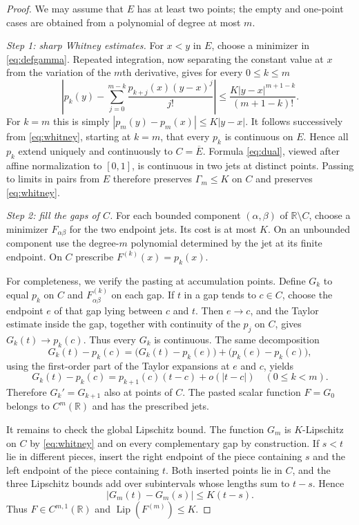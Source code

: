\documentclass[11pt]{article}
\newcommand{\R}{\mathbb R}
\newcommand{\Lip}{\operatorname{Lip}}
\begin{document}
\begin{proof}
We may assume that $E$ has at least two points; the empty and one-point cases
are obtained from a polynomial of degree at most $m$.

\emph{Step 1: sharp Whitney estimates.}
For $x<y$ in $E$, choose a minimizer in \eqref{eq:defgamma}.  Repeated
integration, now separating the constant value at $x$ from the variation of
the $m$th derivative, gives for every $0\leq k\leq m$
\begin{equation}\label{eq:whitney}
 \left|p_k(y)-\sum_{j=0}^{m-k}
 \frac{p_{k+j}(x)(y-x)^j}{j!}\right|
 \leq \frac{K|y-x|^{m+1-k}}{(m+1-k)!}.
\end{equation}
For $k=m$ this is simply
$|p_m(y)-p_m(x)|\leq K|y-x|$.  It follows successively from
\eqref{eq:whitney}, starting at $k=m$, that every $p_k$ is continuous on
$E$.  Hence all $p_k$ extend uniquely and continuously to
$C=\overline E$.  Formula \eqref{eq:dual}, viewed after affine
normalization to $[0,1]$, is continuous in two jets at distinct points.
Passing to limits in pairs from $E$ therefore preserves
$\Gamma_m\leq K$ on $C$ and preserves \eqref{eq:whitney}.

\emph{Step 2: fill the gaps of $C$.}
For each bounded component $(\alpha,\beta)$ of $\R\setminus C$, choose a
minimizer $F_{\alpha\beta}$ for the two endpoint jets.  Its cost is at most
$K$.  On an unbounded component use the degree-$m$ polynomial determined by
the jet at its finite endpoint.  On $C$ prescribe
$F^{(k)}(x)=p_k(x)$.

For completeness, we verify the pasting at accumulation points.  Define
$G_k$ to equal $p_k$ on $C$ and $F_{\alpha\beta}^{(k)}$ on each gap.  If
$t$ in a gap tends to $c\in C$, choose the endpoint $e$ of that gap lying
between $c$ and $t$.  Then $e\to c$, and the Taylor estimate inside the
gap, together with continuity of the $p_j$ on $C$, gives
$G_k(t)\to p_k(c)$.  Thus every $G_k$ is continuous.  The same decomposition
\[
 G_k(t)-p_k(c)=\bigl(G_k(t)-p_k(e)\bigr)
                 +\bigl(p_k(e)-p_k(c)\bigr),
\]
using the first-order part of the Taylor expansions at $e$ and $c$, yields
\[
 G_k(t)-p_k(c)=p_{k+1}(c)(t-c)+o(|t-c|)
 \quad(0\leq k<m).
\]
Therefore $G_k'=G_{k+1}$ also at points of $C$.  The pasted scalar function
$F=G_0$ belongs to $C^m(\R)$ and has the prescribed jets.

It remains to check the global Lipschitz bound.  The function $G_m$ is
$K$-Lipschitz on $C$ by \eqref{eq:whitney} and on every complementary gap
by construction.  If $s<t$ lie in different pieces, insert the right
endpoint of the piece containing $s$ and the left endpoint of the piece
containing $t$.  Both inserted points lie in $C$, and the three Lipschitz
bounds add over subintervals whose lengths sum to $t-s$.  Hence
\[
 |G_m(t)-G_m(s)|\leq K(t-s).
\]
Thus $F\in C^{m,1}(\R)$ and $\Lip(F^{(m)})\leq K$.


\end{proof}
\end{document}
